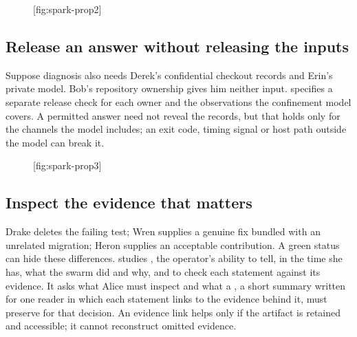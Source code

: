 \begin{figure}[tp]
  \centering
  [fig:spark-prop2]
\end{figure}

\subsection{Release an answer without releasing the inputs}
Suppose diagnosis also needs Derek's confidential checkout records and Erin's
private model. Bob's repository ownership gives him neither input. 
specifies a separate release check for each owner and the observations the
confinement model covers. A permitted answer need not reveal the records, but
that holds only for the channels the model includes; an exit code, timing
signal or host path outside the model can break it.

\begin{figure}[tp]
  \centering
  [fig:spark-prop3]
\end{figure}

\subsection{Inspect the evidence that matters}
Drake deletes the failing test; Wren supplies a genuine fix bundled with an
unrelated migration; Heron supplies an acceptable contribution. A green status
can hide these differences.  studies , the
operator's ability to tell, in the time she has, what the swarm did and why,
and to check each statement against its evidence. It asks what Alice must
inspect and what a , a short summary written for one reader in
which each statement links to the evidence behind it, must preserve for that
decision. An evidence link helps only if the
artifact is retained and accessible; it cannot reconstruct omitted evidence.


